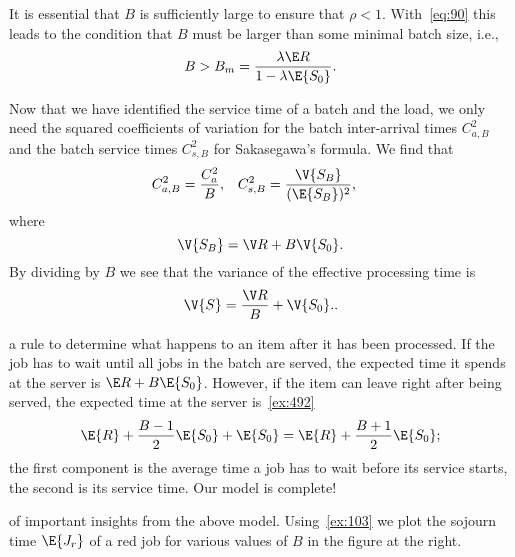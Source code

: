 It is essential that $B$ is sufficiently large to ensure that $\rho<1$.
With~\cref{eq:90} this leads to the condition that $B$ must be larger than some minimal batch size, i.e.,
\begin{equation*}
B> B_m = \frac{\lambda \E R}{1-\lambda \E{S_0}}.
\end{equation*}

Now that we have identified the service time of a batch and the load, we only need the squared coefficients of variation for the batch inter-arrival times $C_{a,B}^2$ and the batch service times $C_{s,B}^2$ for Sakasegawa's formula.
We find that
 \begin{align}\label{eq:82}
C_{a,B}^2 &= \frac{C_{a}^2}B, &
C_{s, B}^2 &= \frac{\V{S_B}}{(\E{S_B})^2},
\end{align}
where
\begin{equation*}
  \V{S_B} = \V R  + B \V{S_0}.
\end{equation*}
By dividing by $B$ we see that the variance of the effective processing time is
\begin{equation}  \label{eq:107}
  \V{S} = \frac{\V R}{B} + \V{S_0}..
\end{equation}

 a rule to determine what happens to an item after it has been processed.
If the job has to wait until all jobs in the batch are served, the expected time it spends at the server is $\E R + B \E{S_0}$.
However, if the item can leave
right after being served, the expected time at the server is~\cref{ex:492}
\begin{equation}\label{eq:85}
\E{R} + \frac{B-1}{2}\E{S_0} + \E{S_0}= \E{R} + \frac{B+1}{2}\E{S_0};
\end{equation}
the first component is the average time a job has to wait before its service starts, the second is its service time.
Our model is complete!



 of important insights from the above model.
Using~\cref{ex:103} we plot the sojourn time $\E{J_r}$ of a red job for various values of $B$ in the figure at the right.


